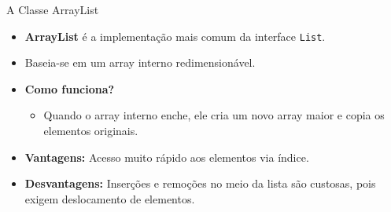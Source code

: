 \documentclass[9pt]{beamer}
\begin{document}
\begin{frame}{A Classe ArrayList}
    \begin{itemize}
        \item \textbf{ArrayList} é a implementação mais comum da interface \texttt{List}.
        \item Baseia-se em um array interno redimensionável.
        \item \textbf{Como funciona?}
        \begin{itemize}
            \item Quando o array interno enche, ele cria um novo array maior e copia os elementos originais.
        \end{itemize}
        \item \textbf{Vantagens:} Acesso muito rápido aos elementos via índice.
        \item \textbf{Desvantagens:} Inserções e remoções no meio da lista são custosas, pois exigem deslocamento de elementos.
    \end{itemize}
\end{frame}
\end{document}
